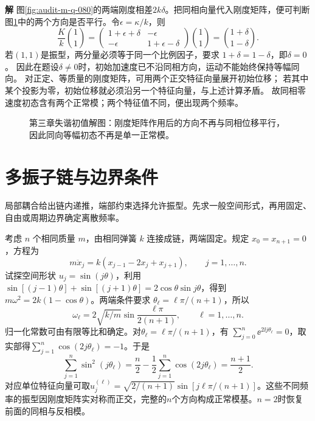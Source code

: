 \documentclass[11pt,openany,fontset=fandol]{ctexbook}
\theoremstyle{plain}\newtheorem{theorem}{定理}[chapter]\newtheorem{proposition}[theorem]{命题}
\theoremstyle{definition}\newtheorem{definition}{定义}[chapter]\newtheorem{example}{例}[chapter]
\theoremstyle{remark}\newtheorem*{remark}{说明}
\newcommand{\SolutionStart}{\par\nobreak\medskip\nobreak\noindent\textbf{解}\quad\ignorespaces}
\newenvironment{solution}{\SolutionStart}{\par\medskip}
\begin{document}

\begin{solution}
图\ref{fig:audit-m-q-080}的两端刚度相差$2k\delta$。把同相向量代入刚度矩阵，便可判断图\ref{fig:class-3-3}中的两个方向是否平行。令$\epsilon=\kappa/k$，则
\[
 \frac Kk\binom11=
 \begin{pmatrix}1+\epsilon+\delta&-\epsilon\\-\epsilon&1+\epsilon-\delta\end{pmatrix}
 \binom11=\binom{1+\delta}{1-\delta}.
\]
若$(1,1)$是振型，两分量必须等于同一个比例因子，要求
$1+\delta=1-\delta$，即$\delta=0$。
因此在题设$\delta\ne0$时，初始加速度已不沿同相方向，运动不能始终保持等幅同向。
对正定、等质量的刚度矩阵，可用两个正交特征向量展开初始位移；
若其中某个投影为零，初始位移就必须沿另一个特征向量，与上述计算矛盾。
故同相零速度初态含有两个正常模；两个特征值不同，便出现两个频率。

\begin{figure}[H]\centering
{}
\caption{第三章失谐初值解图：刚度矩阵作用后的方向不再与同相位移平行，因此同向等幅初态不再是单一正常模。}\label{fig:class-3-3}
\end{figure}
\end{solution}

\section{多振子链与边界条件}
局部耦合给出链内递推，端部约束选择允许振型。先求一般空间形式，再用固定、自由或周期边界确定离散频率。

考虑 $n$ 个相同质量 $m$，由相同弹簧 $k$ 连接成链，两端固定。规定 $x_0=x_{n+1}=0$，方程为
\begin{equation}
m\ddot x_j=k(x_{j-1}-2x_j+x_{j+1}),\qquad j=1,\ldots,n.
\end{equation}
试探空间形状 $u_j=\sin(j\theta)$，利用 $\sin[(j-1)\theta]+\sin[(j+1)\theta]=2\cos\theta\sin j\theta$，得到 $m\omega^2=2k(1-\cos\theta)$。两端条件要求 $\theta_\ell=\ell\pi/(n+1)$，所以
\begin{equation}
\omega_\ell=2\sqrt{k/m}\sin\frac{\ell\pi}{2(n+1)},\qquad \ell=1,\ldots,n.
\end{equation}
归一化常数可由有限等比和确定。对$\theta_\ell=\ell\pi/(n+1)$，有
$\sum_{j=0}^{n}\ee^{2\ii j\theta_\ell}=0$，取实部得$\sum_{j=1}^n\cos(2j\theta_\ell)=-1$。于是
\[\sum_{j=1}^n\sin^2(j\theta_\ell)
=\frac n2-\frac12\sum_{j=1}^n\cos(2j\theta_\ell)=\frac{n+1}{2}.\]
对应单位特征向量可取$u_j^{(\ell)}=\sqrt{2/(n+1)}\sin[j\ell\pi/(n+1)]$。这些不同频率的振型因刚度矩阵实对称而正交，完整的$n$个方向构成正常模基。$n=2$时恢复前面的同相与反相模。
\end{document}
